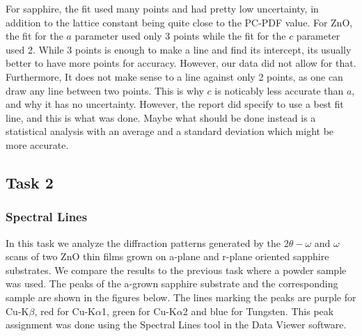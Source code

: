 \documentclass{article}
\begin{document}
	For sapphire, the fit used many points and had pretty low uncertainty, in addition to the lattice constant being quite close to the PC-PDF value.
For ZnO, the fit for the $a$ parameter used only 3 points while the fit for the $c$ parameter used 2. While 3 points is enough to make a line and find its intercept, its usually better to have more points for accuracy. However, our data did not allow for that. Furthermore, It does not make sense to a line against only 2 points, as one can draw any line between two points. This is why $c$ is noticably less accurate than $a$, and why it has no uncertainty. 
However, the report did specify to use a best fit line, and this is what was done. Maybe what should be done instead is a statistical analysis with an average and a standard deviation which might be more accurate.

\pagebreak{}

\subsection{Task 2}
\label{subsection:Task2}

\subsubsection{Spectral Lines}

	In this task we analyze the diffraction patterns generated by the $2\theta - \omega$ and $\omega$ scans of two ZnO thin films grown on a-plane and r-plane oriented sapphire substrates. We compare the results to the previous task where a powder sample was used. The peaks of the a-grown sapphire substrate and the corresponding sample are shown in the figures below. The lines marking the peaks are purple for Cu-K$\beta$, red for Cu-K$\alpha$1, green for Cu-K$\alpha$2 and blue for Tungsten. This peak assignment was done using the Spectral Lines tool in the Data Viewer software. 
\end{document}
